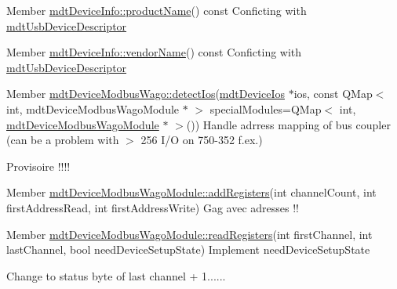 \begin{DoxyDescription}
\item[Member \hyperlink{classmdt_device_info_afe4bbdc87acff59999905a0eeb812fe1}{mdtDeviceInfo::productName}() const  ]Conficting with \hyperlink{classmdt_usb_device_descriptor}{mdtUsbDeviceDescriptor} 
\end{DoxyDescription}

\label{todo__todo000033}
\hypertarget{todo__todo000033}{}
 
\begin{DoxyDescription}
\item[Member \hyperlink{classmdt_device_info_a207d7b6b49fd65726232e95cd9e0568c}{mdtDeviceInfo::vendorName}() const  ]Conficting with \hyperlink{classmdt_usb_device_descriptor}{mdtUsbDeviceDescriptor} 
\end{DoxyDescription}

\label{todo__todo000010}
\hypertarget{todo__todo000010}{}
 
\begin{DoxyDescription}
\item[Member \hyperlink{classmdt_device_modbus_wago_af26af790e502e5b85498540dd215cff7}{mdtDeviceModbusWago::detectIos}(\hyperlink{classmdt_device_ios}{mdtDeviceIos} $\ast$ios, const QMap$<$ int, mdtDeviceModbusWagoModule $\ast$ $>$ specialModules=QMap$<$ int, \hyperlink{classmdt_device_modbus_wago_module}{mdtDeviceModbusWagoModule} $\ast$ $>$()) ]Handle adrress mapping of bus coupler (can be a problem with $>$ 256 I/O on 750-\/352 f.ex.) 

Provisoire !!!! 
\end{DoxyDescription}

\label{todo__todo000013}
\hypertarget{todo__todo000013}{}
 
\begin{DoxyDescription}
\item[Member \hyperlink{classmdt_device_modbus_wago_module_ad803f3aa8d9777feaa5cdb3a4cccd316}{mdtDeviceModbusWagoModule::addRegisters}(int channelCount, int firstAddressRead, int firstAddressWrite) ]Gag avec adresses !! 
\end{DoxyDescription}

\label{todo__todo000014}
\hypertarget{todo__todo000014}{}
 
\begin{DoxyDescription}
\item[Member \hyperlink{classmdt_device_modbus_wago_module_aa775cffab72f7ed7cd92a48d26da3225}{mdtDeviceModbusWagoModule::readRegisters}(int firstChannel, int lastChannel, bool needDeviceSetupState) ]Implement needDeviceSetupState 

Change to status byte of last channel + 1...... 
\end{DoxyDescription}

